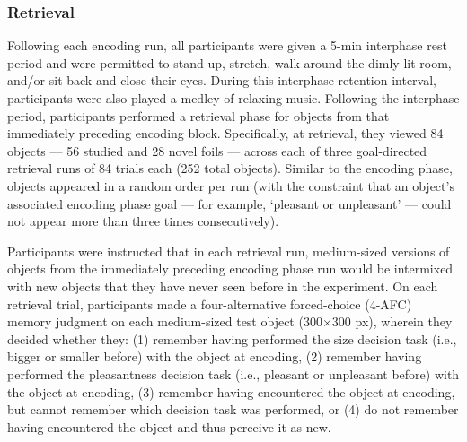 \subsubsection{Retrieval}

Following each encoding run, all participants were given a 5-min interphase rest period and were permitted to stand up, stretch, walk around the dimly lit room, and/or sit back and close their eyes. During this interphase retention interval, participants were also played a medley of relaxing music. Following the interphase period, participants performed a retrieval phase for objects from that immediately preceding encoding block. Specifically, at retrieval, they viewed 84 objects –– 56 studied and 28 novel foils –– across each of three goal-directed retrieval runs of 84 trials each (252 total objects). Similar to the encoding phase, objects appeared in a random order per run (with the constraint that an object's associated encoding phase goal –– for example, `pleasant or unpleasant' –– could not appear more than three times consecutively).

Participants were instructed that in each retrieval run, medium-sized versions of objects from the immediately preceding encoding phase run would be intermixed with new objects that they have never seen before in the experiment. On each retrieval trial, participants made a four-alternative forced-choice (4-AFC) memory judgment on each medium-sized test object (300$\times$300 px), wherein they decided whether they: (1) remember having performed the size decision task (i.e., bigger or smaller before) with the object at encoding, (2) remember having performed the pleasantness decision task (i.e., pleasant or unpleasant before) with the object at encoding, (3) remember having encountered the object at encoding, but cannot remember which decision task was performed, or (4) do not remember having encountered the object and thus perceive it as new. 

